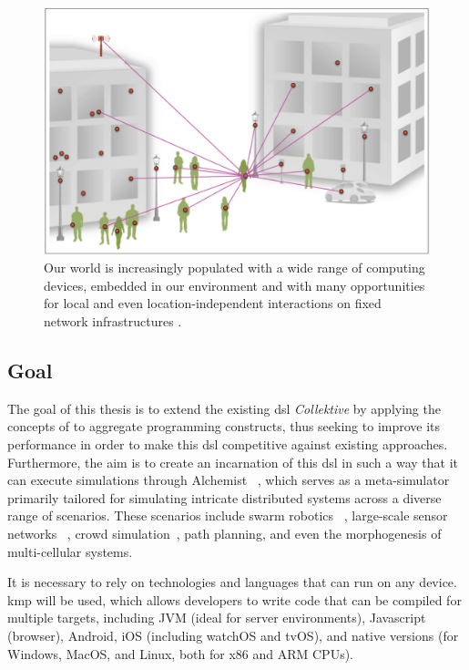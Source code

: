 \begin{figure} [!ht]
    \centering
    \includegraphics[width=.8\linewidth]{figures/smart-network-objects}
    \caption{Our world is increasingly populated with a wide range of computing devices, embedded in our environment
    and with many opportunities for local and even location-independent interactions on fixed network infrastructures \cite{7274429}.}
    \label{fig:smart-network-objects}
\end{figure}

\subsection{Goal}
\label{subsec:goal}
The goal of this thesis is to extend the existing \ac{dsl} \emph{Collektive} by applying the concepts of \xc{} to
aggregate programming constructs, thus seeking to improve its performance in order to make this \ac{dsl} competitive
against existing approaches.
Furthermore, the aim is to create an incarnation of this \ac{dsl} in such a way that it can execute simulations through
Alchemist ~\cite{10.1007/978-3-030-78198-9_10}, which serves as a meta-simulator primarily tailored for simulating
intricate distributed systems across a diverse range of scenarios.
These scenarios include swarm robotics ~\cite{aguzzi2024macroswarm}, large-scale sensor networks ~\cite{9927406}, crowd
simulation~\cite{7274429}, path planning, and even the morphogenesis of multi-cellular systems.

It is necessary to rely on technologies and languages that can run on any device.
\ac{kmp} will be used, which allows developers to write code that can be compiled for multiple targets,
including JVM (ideal for server environments), Javascript (browser), Android, iOS (including watchOS and tvOS), and native versions
(for Windows, MacOS, and Linux, both for x86 and ARM CPUs).

